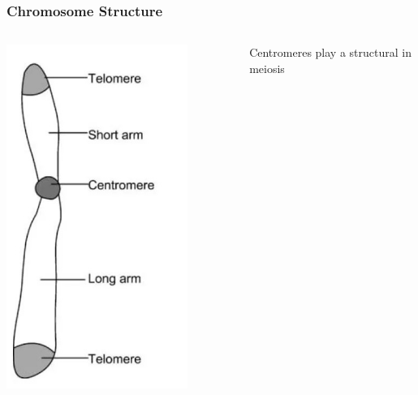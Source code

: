 \documentclass{beamer}
\begin{document}
\begin{frame}
	\frametitle{Chromosome Structure}
\begin{columns}
	\begin{column}{0.5\textwidth}

\centering	\includegraphics[keepaspectratio, width  =0.8\textwidth]{img/chromosomeDiagram} \pause
	\end{column}
	\begin{column}{0.5\textwidth}
	\centering	Centromeres play a structural in meiosis\\
	\vspace{5pt}	

\end{column}
\end{columns}
\end{frame}
\end{document}
